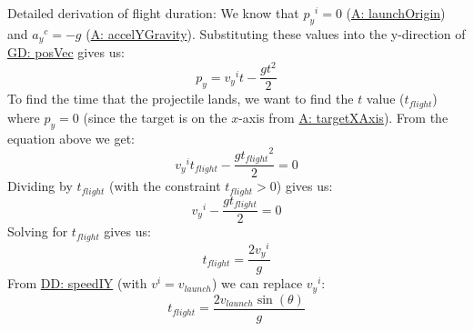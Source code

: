 \documentclass[12pt]{article}
\begin{document}
Detailed derivation of flight duration:
We know that ${{p_{y}}^{i}}=0$ (\hyperref[launchOrigin]{A: launchOrigin}) and ${{a_{y}}^{c}}=-g$ (\hyperref[accelYGravity]{A: accelYGravity}). Substituting these values into the y-direction of \hyperref[GD:posVec]{GD: posVec} gives us:
\begin{displaymath}
{p_{y}}={{v_{y}}^{i}} t-\frac{g t^{2}}{2}
\end{displaymath}
To find the time that the projectile lands, we want to find the $t$ value (${t_{flight}}$) where ${p_{y}}=0$ (since the target is on the $x$-axis from \hyperref[targetXAxis]{A: targetXAxis}). From the equation above we get:
\begin{displaymath}
{{v_{y}}^{i}} {t_{flight}}-\frac{g {t_{flight}}^{2}}{2}=0
\end{displaymath}
Dividing by ${t_{flight}}$ (with the constraint ${t_{flight}}>0$) gives us:
\begin{displaymath}
{{v_{y}}^{i}}-\frac{g {t_{flight}}}{2}=0
\end{displaymath}
Solving for ${t_{flight}}$ gives us:
\begin{displaymath}
{t_{flight}}=\frac{2 {{v_{y}}^{i}}}{g}
\end{displaymath}
From \hyperref[DD:speedIY]{DD: speedIY} (with ${v^{i}}={v_{launch}}$) we can replace ${{v_{y}}^{i}}$:
\begin{displaymath}
{t_{flight}}=\frac{2 {v_{launch}} \sin\left(θ\right)}{g}
\end{displaymath}
\par~
\end{document}
